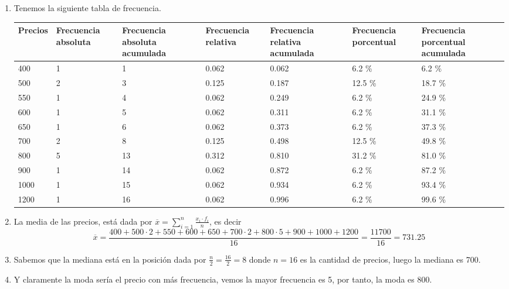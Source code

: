 \begin{solution}
    \begin{enumerate}
        \item Tenemos la siguiente tabla de frecuencia.
        \begin{table}[H]
            \centering
            \begin{tabular}{|p{1.7cm}|p{1.8cm}|p{2cm}|p{1.8cm}|p{2cm}|p{2cm}|p{2cm}|}
                \hline
                Precios & Frecuencia absoluta & Frecuencia absoluta acumulada & Frecuencia relativa & Frecuencia relativa acumulada & Frecuencia porcentual & Frecuencia porcentual acumulada\\
                \hline\hline
                 400 & 1 &  1 & 0.062 & 0.062 &  6.2 \% &  6.2 \% \\\hline
                 500 & 2 &  3 & 0.125 & 0.187 & 12.5 \% & 18.7 \% \\\hline
                 550 & 1 &  4 & 0.062 & 0.249 &  6.2 \% & 24.9 \% \\\hline
                 600 & 1 &  5 & 0.062 & 0.311 &  6.2 \% & 31.1 \% \\\hline
                 650 & 1 &  6 & 0.062 & 0.373 &  6.2 \% & 37.3 \% \\\hline
                 700 & 2 &  8 & 0.125 & 0.498 & 12.5 \% & 49.8 \% \\\hline
                 800 & 5 & 13 & 0.312 & 0.810 & 31.2 \% & 81.0 \% \\\hline
                 900 & 1 & 14 & 0.062 & 0.872 &  6.2 \% & 87.2 \% \\\hline
                1000 & 1 & 15 & 0.062 & 0.934 &  6.2 \% & 93.4 \% \\\hline
                1200 & 1 & 16 & 0.062 & 0.996 &  6.2 \% & 99.6 \% \\\hline
            \end{tabular}
        \end{table}
        \item La media de las precios, está dada por $\overline{x} = \sum_{i = 1}^{n} \frac{x_i \cdot f_i}{n}$, es decir
        \[
            \overline{x} = \frac{400 + 500\cdot2 + 550 + 600 + 650 + 700\cdot2 + 800\cdot5 + 900 + 1000 + 1200}{16} = \frac{11700}{16} = 731.25
        \]
        \item Sabemos que la mediana está en la posición dada por $\frac{n}{2} = \frac{16}{2} = 8$ donde $n = 16$ es la cantidad de precios, luego la mediana es 700.
        \item Y claramente la moda sería el precio con más frecuencia, vemos la mayor frecuencia es 5, por tanto, la moda es 800. \qedhere
    \end{enumerate}
\end{solution}

